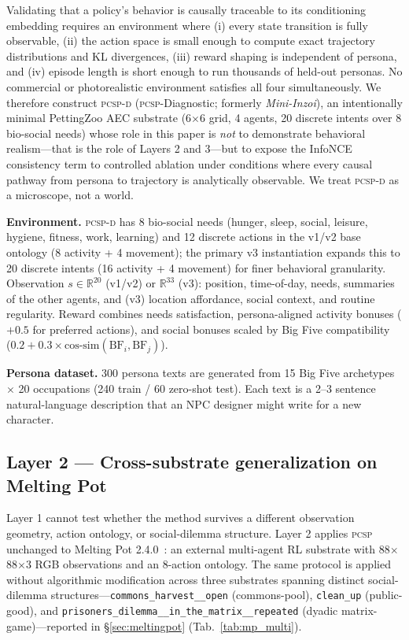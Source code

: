 \documentclass[conference]{IEEEtran}
\newcommand{\PCSP}{\textsc{pcsp}\xspace}
\newcommand{\PCSPD}{\textsc{pcsp-d}\xspace}
\begin{document}
Validating that a policy's behavior is causally traceable to its conditioning
embedding requires an environment where (i) every state transition is fully
observable, (ii) the action space is small enough to compute exact trajectory
distributions and KL divergences, (iii) reward shaping is independent of
persona, and (iv) episode length is short enough to run thousands of held-out
personas. No commercial or photorealistic environment satisfies all four
simultaneously. We therefore construct \PCSPD{} (\PCSP-Diagnostic; formerly
\textit{Mini-Inzoi}), an intentionally minimal PettingZoo AEC substrate
(6$\times$6 grid, 4 agents, 20 discrete intents over 8 bio-social needs) whose
role in this paper is \emph{not} to demonstrate behavioral realism---that is
the role of Layers 2 and 3---but to expose the InfoNCE consistency term to
controlled ablation under conditions where every causal pathway from persona
to trajectory is analytically observable. We treat \PCSPD{} as a microscope,
not a world.

\textbf{Environment.}
\PCSPD{} has 8 bio-social needs (hunger, sleep, social, leisure, hygiene,
fitness, work, learning) and 12 discrete actions in the v1/v2 base ontology
(8 activity + 4 movement); the primary v3 instantiation expands this to 20
discrete intents (16 activity + 4 movement) for finer behavioral granularity.
Observation $s\!\in\!\mathbb{R}^{20}$ (v1/v2) or $\mathbb{R}^{33}$ (v3):
position, time-of-day, needs, summaries of the other agents, and (v3) location
affordance, social context, and routine regularity.
Reward combines needs satisfaction, persona-aligned activity bonuses ($+0.5$
for preferred actions), and social bonuses scaled by Big Five
compatibility~\cite{mccrae1992introduction}
($0.2 + 0.3 \times \text{cos-sim}(\text{BF}_i, \text{BF}_j)$).

\textbf{Persona dataset.}
300 persona texts are generated from 15 Big Five archetypes $\times$ 20
occupations (240 train / 60 zero-shot test).
Each text is a 2--3 sentence natural-language description that an NPC designer
might write for a new character.

\subsection{Layer 2 — Cross-substrate generalization on Melting Pot}
\label{sec:layer2env}

Layer 1 cannot test whether the method survives a different observation
geometry, action ontology, or social-dilemma structure. Layer 2 applies
\PCSP{} unchanged to Melting Pot 2.4.0~\cite{leibo2021meltingpot}: an
external multi-agent RL substrate with 88$\times$88$\times$3 RGB
observations and an 8-action ontology. The same protocol is applied
without algorithmic modification across three substrates spanning distinct
social-dilemma structures---\texttt{commons\_harvest\_\_open} (commons-pool),
\texttt{clean\_up} (public-good), and
\texttt{prisoners\_dilemma\_\_in\_the\_matrix\_\_repeated}
(dyadic matrix-game)---reported in \S\ref{sec:meltingpot} (Tab.~\ref{tab:mp_multi}).
\end{document}
